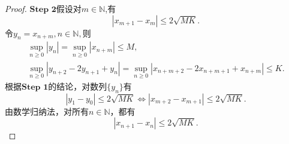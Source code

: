 \documentclass[../../main.tex]{subfiles}%
\begin{document}
\begin{proof}
$\mathbf{Step}\,\,\mathbf{2}$假设对$m\in\mathbb{N}$,有
$$|x_{m+1}-x_m|\leqslant2\sqrt{MK}.$$
令$y_n = x_{n+m}, n\in \mathbb{N},$则
\begin{gather*}
\mathop {\mathrm{sup}} \limits_{n\geqslant 0}\left| y_n \right|=\mathop {\mathrm{sup}} \limits_{n\geqslant 0}\left| x_{n+m} \right|\leqslant M,
\\
\mathop {\mathrm{sup}} \limits_{n\geqslant 0}\left| y_{n+2}-2y_{n+1}+y_n \right|=\mathop {\mathrm{sup}} \limits_{n\geqslant 0}\left| x_{n+m+2}-2x_{n+m+1}+x_{n+m} \right|\leqslant K.
\end{gather*}
根据$\mathbf{Step}\,\,\mathbf{1}$的结论，对数列$\{y_n\}$有
$$
|y_1-y_0|\leqslant2\sqrt{MK}\iff |x_{m+2}-x_{m+1}|\leqslant2\sqrt{MK}.
$$
由数学归纳法，对所有$n\in\mathbb{N}$，都有
$$|x_{n+1}-x_n|\leqslant2\sqrt{MK}.$$
\end{proof}
\end{document}
